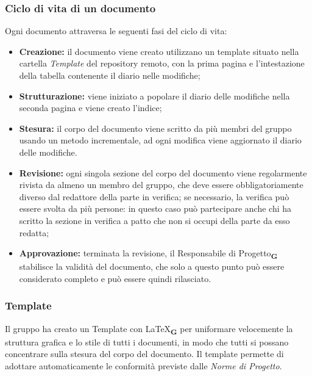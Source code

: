         \subsubsection{Ciclo di vita di un documento}
        Ogni documento attraversa le seguenti fasi del ciclo di vita:
        \begin{itemize}
            \item \textbf{Creazione:} il documento viene creato utilizzano un template situato nella cartella \textit{Template} del repository remoto, con la prima pagina e l'intestazione della tabella contenente il diario nelle modifiche;
            \item \textbf{Strutturazione:} viene iniziato a popolare il diario delle modifiche nella seconda pagina e viene creato l'indice;
            \item \textbf{Stesura:} il corpo del documento viene scritto da più membri del gruppo usando un metodo incrementale, ad ogni modifica viene aggiornato il diario delle modifiche.
            \item \textbf{Revisione:} ogni singola sezione del corpo del documento viene regolarmente rivista da almeno un membro del gruppo, che deve essere obbligatoriamente diverso dal redattore della parte in verifica; se necessario, la verifica può essere svolta da più persone: in questo caso può partecipare anche chi ha scritto la sezione in verifica a patto che non si occupi della parte da esso redatta;
            \item \textbf{Approvazione:} terminata la revisione, il Responsabile di Progetto\textsubscript{\textbf{G}} stabilisce la validità del documento, che solo a questo punto può essere considerato completo e può essere quindi rilasciato.
        \end{itemize}
        \subsubsection{Template}
        Il gruppo ha creato un Template con \LaTeX\textsubscript{\textbf{G}} per uniformare velocemente la struttura grafica e lo stile di tutti i documenti, in modo che tutti si possano concentrare sulla stesura del corpo del documento. Il template permette di adottare automaticamente le conformità previste dalle \textit{Norme di Progetto}.
